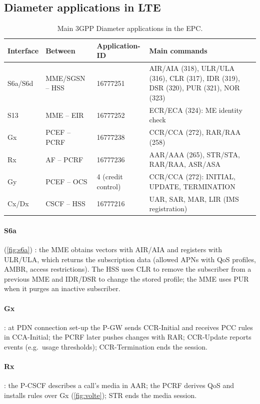 \documentclass[11pt,a4paper]{article}
\begin{document}
\subsection{Diameter applications in LTE}
\begin{table}[htbp]
\centering\small
\caption{Main 3GPP Diameter applications in the EPC.}\label{tab:apps}
\begin{tabularx}{\linewidth}{@{}l l l Y@{}}
\toprule
{}Interface & Between & Application-ID & Main commands \\
\midrule
S6a/S6d & MME/SGSN -- HSS & 16777251 & AIR/AIA (318), ULR/ULA (316), CLR (317), IDR (319), DSR (320), PUR (321), NOR (323) \\
S13     & MME -- EIR      & 16777252 & ECR/ECA (324): ME identity check \\
Gx      & PCEF -- PCRF    & 16777238 & CCR/CCA (272), RAR/RAA (258) \\
Rx      & AF -- PCRF      & 16777236 & AAR/AAA (265), STR/STA, RAR/RAA, ASR/ASA \\
Gy      & PCEF -- OCS     & 4 (credit control) & CCR/CCA (272): INITIAL, UPDATE, TERMINATION \\
Cx/Dx   & CSCF -- HSS     & 16777216 & UAR, SAR, MAR, LIR (IMS registration) \\
\bottomrule
\end{tabularx}
\end{table}

\paragraph{S6a} (\cref{fig:s6a}) \cite{ts29272}: the MME obtains vectors with AIR/AIA and registers with
ULR/ULA, which returns the subscription data (allowed APNs with QoS profiles, AMBR, access restrictions).
The HSS uses CLR to remove the subscriber from a previous MME and IDR/DSR to change the stored profile; the
MME uses PUR when it purges an inactive subscriber.
\paragraph{Gx} \cite{ts29212}: at PDN connection set-up the P-GW sends CCR-Initial and receives PCC rules in
CCA-Initial; the PCRF later pushes changes with RAR; CCR-Update reports events (e.g.\ usage thresholds);
CCR-Termination ends the session.
\paragraph{Rx} \cite{ts29214}: the P-CSCF describes a call's media in AAR; the PCRF derives QoS and installs
rules over Gx (\cref{fig:volte}); STR ends the media session.
\end{document}
